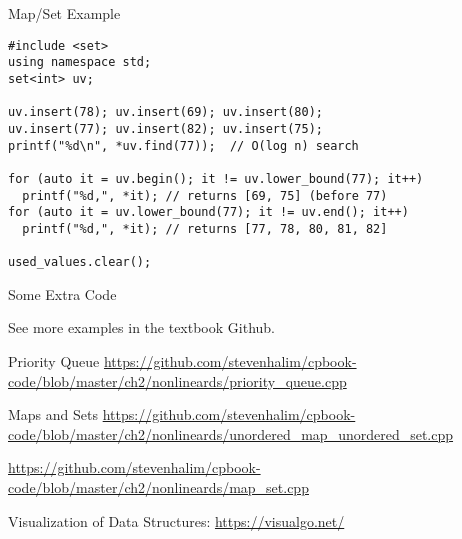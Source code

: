 \begin{frame}[fragile]{Map/Set Example}

{\smal
\begin{verbatim}
#include <set>
using namespace std;
set<int> uv;

uv.insert(78); uv.insert(69); uv.insert(80);
uv.insert(77); uv.insert(82); uv.insert(75);
printf("%d\n", *uv.find(77));  // O(log n) search

for (auto it = uv.begin(); it != uv.lower_bound(77); it++)
  printf("%d,", *it); // returns [69, 75] (before 77)
for (auto it = uv.lower_bound(77); it != uv.end(); it++)
  printf("%d,", *it); // returns [77, 78, 80, 81, 82]

used_values.clear();
\end{verbatim}}
\end{frame}

\begin{frame}{Some Extra Code}

See more examples in the textbook Github.

\begin{block}{Priority Queue}
\url{https://github.com/stevenhalim/cpbook-code/blob/master/ch2/nonlineards/priority_queue.cpp}
\end{block}

\begin{block}{Maps and Sets}
\url{https://github.com/stevenhalim/cpbook-code/blob/master/ch2/nonlineards/unordered_map_unordered_set.cpp}

\url{https://github.com/stevenhalim/cpbook-code/blob/master/ch2/nonlineards/map_set.cpp}
\end{block}

Visualization of Data Structures:
\url{https://visualgo.net/}
\end{frame}
